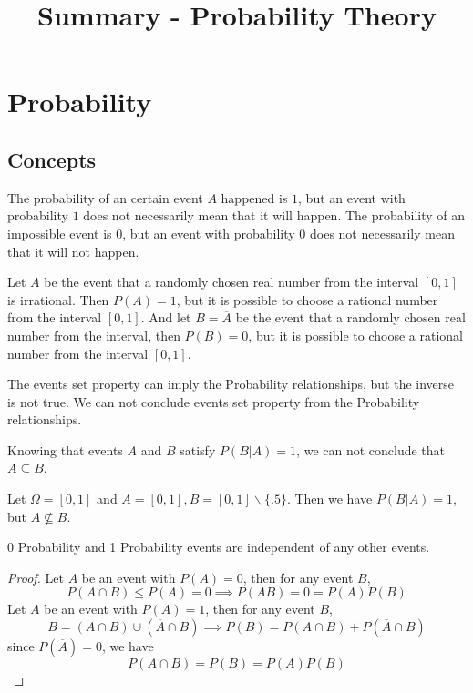 \documentclass{template}
\title{Summary - Probability Theory}
\begin{document}
\maketitle

\section{Probability}

\subsection{Concepts}

The probability of an certain event $A$ happened is $1$, but an
event with probability $1$ does not necessarily mean that it will happen.
The probability of an impossible event is $0$, but an event with probability $0$ does
not necessarily mean that it will not happen.
\begin{example}
	Let $A$ be the event that a randomly chosen real number from the interval
	$[0, 1]$ is irrational. Then $P(A) = 1$, but it is possible to choose a rational
	number from the interval $[0, 1]$.
	And let $B=\overline{A}$ be the event that a randomly chosen real number from the interval,
	then $P(B) = 0$, but it is possible to choose a rational number from the interval $[0, 1]$.
\end{example}

The events set property can imply the Probability relationships, but
the inverse is not true. We can not conclude events set property from the Probability
relationships.

\begin{example}
	Knowing that events $A$ and $B$ satisfy $P(B|A)=1$, we can not conclude that
	$A \subseteq B$. 

	Let $\Omega=[0,1]$ and $A=[0,1], B=[0,1]\backslash \{.5\}$. Then we have $P(B|A)=1$, but
	$A \not\subseteq B$.
\end{example}

\begin{theorem}
0 Probability and 1 Probability events are independent of any other events.
\begin{proof}
	Let $A$ be an event with $P(A)=0$, then for any event $B$,
	\[
		P(A \cap B) \leq P(A) = 0 \implies P(A  B) = 0 = P(A)P(B)
	\]
	Let $A$ be an event with $P(A)=1$, then for any event $B$,
	\[
		B = (A \cap B) \cup (\overline{A} \cap B) \implies P(B) = P(A \cap B) + P(\overline{A} \cap B)
	\]
	since $P(\overline{A}) = 0$, we have
	\[
		P(A \cap B) = P(B) = P(A)P(B)
	\] 
\end{proof}
\end{theorem}
\end{document}
